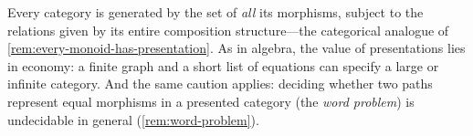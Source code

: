 \begin{remark}
    Every category is generated by the set of \emph{all} its morphisms, subject to the relations given by its entire composition structure---the categorical analogue of \cref{rem:every-monoid-has-presentation}.
    As in algebra, the value of presentations lies in economy: a finite graph and a short list of equations can specify a large or infinite category.
    And the same caution applies: deciding whether two paths represent equal morphisms in a presented category (the \emph{word problem}) is undecidable in general (\cref{rem:word-problem}).
\end{remark}


